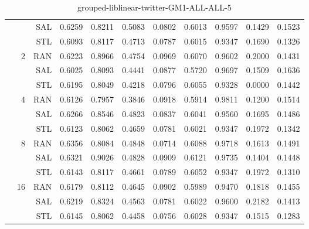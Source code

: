 \begin{center}
\begin{table}[htbp]
\begin{tabular}{ | r | r | r | r | r | r | r | r | r | r | r |}
 &   & SAL & 0.6259 & 0.8211 & 0.5083 & 0.0802 & 0.6013 & 0.9597 & 0.1429 & 0.1523\\ \cline{3-11}
 &   & STL & 0.6093 & 0.8117 & 0.4713 & 0.0787 & 0.6015 & 0.9347 & 0.1690 & 0.1326\\ \cline{2-11}
 & \multirow{3}{*}{2} & RAN & 0.6223 & 0.8966 & 0.4754 & 0.0969 & 0.6070 & 0.9602 & 0.2000 & 0.1431\\ \cline{3-11}
 &   & SAL & 0.6025 & 0.8093 & 0.4441 & 0.0877 & 0.5720 & 0.9697 & 0.1509 & 0.1636\\ \cline{3-11}
 &   & STL & 0.6195 & 0.8049 & 0.4218 & 0.0796 & 0.6055 & 0.9328 & 0.0000 & 0.1442\\ \cline{2-11}
 & \multirow{3}{*}{4} & RAN & 0.6126 & 0.7957 & 0.3846 & 0.0918 & 0.5914 & 0.9811 & 0.1200 & 0.1514\\ \cline{3-11}
 &   & SAL & 0.6266 & 0.8546 & 0.4823 & 0.0837 & 0.6041 & 0.9560 & 0.1695 & 0.1486\\ \cline{3-11}
 &   & STL & 0.6123 & 0.8062 & 0.4659 & 0.0781 & 0.6021 & 0.9347 & 0.1972 & 0.1342\\ \cline{2-11}
 & \multirow{3}{*}{8} & RAN & 0.6356 & 0.8084 & 0.4848 & 0.0714 & 0.6088 & 0.9718 & 0.1613 & 0.1491\\ \cline{3-11}
 &   & SAL & 0.6321 & 0.9026 & 0.4828 & 0.0909 & 0.6121 & 0.9735 & 0.1404 & 0.1448\\ \cline{3-11}
 &   & STL & 0.6143 & 0.8117 & 0.4661 & 0.0789 & 0.6052 & 0.9347 & 0.1972 & 0.1310\\ \cline{2-11}
 & \multirow{3}{*}{16} & RAN & 0.6179 & 0.8112 & 0.4645 & 0.0902 & 0.5989 & 0.9470 & 0.1818 & 0.1455\\ \cline{3-11}
 &   & SAL & 0.6219 & 0.8324 & 0.4563 & 0.0781 & 0.6022 & 0.9600 & 0.2182 & 0.1413\\ \cline{3-11}
 &   & STL & 0.6145 & 0.8062 & 0.4458 & 0.0756 & 0.6028 & 0.9347 & 0.1515 & 0.1283\\ \cline{2-11}
\hline
\end{tabular}
\caption{grouped-liblinear-twitter-GM1-ALL-ALL-5}
\end{table}
\end{center}

